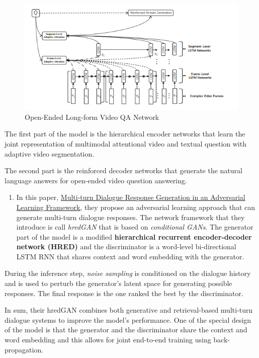 \documentclass[]{book}
\providecommand{\tightlist}{%
  \setlength{\itemsep}{0pt}\setlength{\parskip}{0pt}}
\theoremstyle{definition}
\theoremstyle{definition}
\theoremstyle{definition}
\theoremstyle{remark}
\begin{document}
\begin{figure}
\centering
\includegraphics{img/oe.png}
\caption{Open-Ended Long-form Video QA Network}
\end{figure}

The first part of the model is the hierarchical encoder networks that
learn the joint representation of multimodal attentional video and
textual question with adaptive video segmentation.

The second part is the reinforced decoder networks that generate the
natural language answers for open-ended video question answering.

\begin{enumerate}
\def\labelenumi{\arabic{enumi}.}
\setcounter{enumi}{2}
\tightlist
\item
  In this paper, \href{https://arxiv.org/pdf/1805.11752.pdf}{Multi-turn
  Dialogue Response Generation in an Adversarial Learning Framework},
  they propose an adversarial learning approach that can generate
  multi-turn dialogue responses. The network framework that they
  introduce is call \emph{hredGAN} that is based on \emph{conditional
  GANs}. The generator part of the model is a modified
  \textbf{hierarchical recurrent encoder-decoder network (HRED)} and the
  discriminator is a word-level bi-directional LSTM RNN that shares
  context and word embedding with the generator.
\end{enumerate}

During the inference step, \emph{noise sampling} is conditioned on the
dialogue history and is used to perturb the generator's latent space for
generating possible responses. The final response is the one ranked the
best by the discriminator.

In sum, their hredGAN combines both generative and retrieval-based
multi-turn dialogue systems to improve the model's performance. One of
the special design of the model is that the generator and the
discriminator share the context and word embedding and this allows for
joint end-to-end training using back-propagation.
\end{document}
